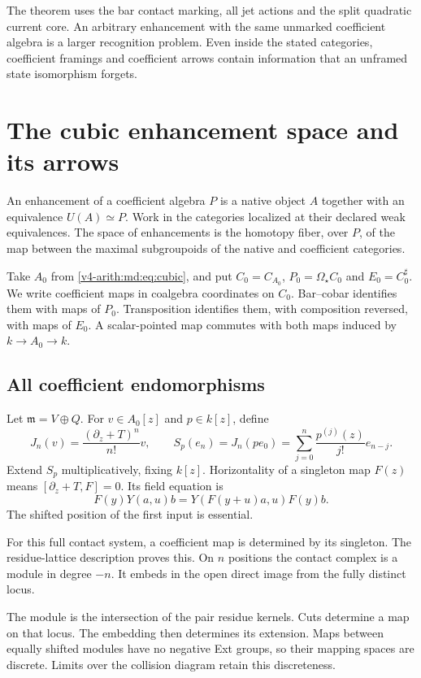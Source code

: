 The theorem uses the bar contact marking, all jet
actions and the split quadratic current core.
An arbitrary enhancement with the same unmarked
coefficient algebra is a larger recognition problem.
Even inside the stated categories, coefficient
framings and coefficient arrows contain information
that an unframed state isomorphism forgets.

\section{The cubic enhancement space and its arrows}
\label{v4-arith:md:sec:enhancements}

An enhancement of a coefficient algebra $P$ is a
native object $A$ together with an equivalence
$U(A)\simeq P$. Work in the categories localized
at their declared weak equivalences. The space of
enhancements is the homotopy fiber, over $P$, of
the map between the maximal subgroupoids of
the native and coefficient categories.

Take $A_0$ from \eqref{v4-arith:md:eq:cubic}, and put
$C_0=C_{A_0}$, $P_0=\Omega_\star C_0$ and
$E_0=C_0^\sharp$. We write coefficient maps in
coalgebra coordinates on $C_0$. Bar--cobar identifies
them with maps of $P_0$. Transposition identifies
them, with composition reversed, with maps of $E_0$.
A scalar-pointed map commutes with both maps induced
by $k\to A_0\to k$.

\subsection{All coefficient endomorphisms}

Let $\mathfrak m=V\oplus Q$. For $v\in A_0[z]$ and
$p\in k[z]$, define
\[
 J_n(v)=\frac{(\partial_z+T)^n}{n!}v,
 \qquad
 S_p(e_n)=J_n(pe_0)
 =\sum_{j=0}^n\frac{p^{(j)}(z)}{j!}e_{n-j}.
\]
Extend $S_p$ multiplicatively, fixing $k[z]$.
Horizontality of a singleton map $F(z)$ means
$[\partial_z+T,F]=0$. Its field equation is
\begin{equation}\label{v4-arith:md:eq:geometric-field-map}
 F(y)Y(a,u)b=Y(F(y+u)a,u)F(y)b.
\end{equation}
The shifted position of the first input is essential.

For this full contact system, a coefficient map is
determined by its singleton. The residue-lattice
description proves this. On $n$ positions the
contact complex is a module in degree $-n$.
It embeds in the open direct image from the fully
distinct locus.

The module is the intersection of the pair
residue kernels. Cuts determine a map on that locus.
The embedding then determines its extension.
Maps between equally shifted modules have no
negative Ext groups, so their mapping spaces are
discrete. Limits over the collision diagram retain
this discreteness.

